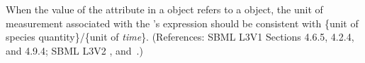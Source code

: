 When the value of the attribute  in a \RateRule object
refers to a \Species object, the unit of measurement associated with the
\RateRule's  expression should be consistent with \{unit of
species quantity\}/\{unit of \emph{time}\}.  (References: SBML L3V1 Sections 4.6.5, 4.2.4, and 4.9.4; SBML L3V2
, 
and~.)
